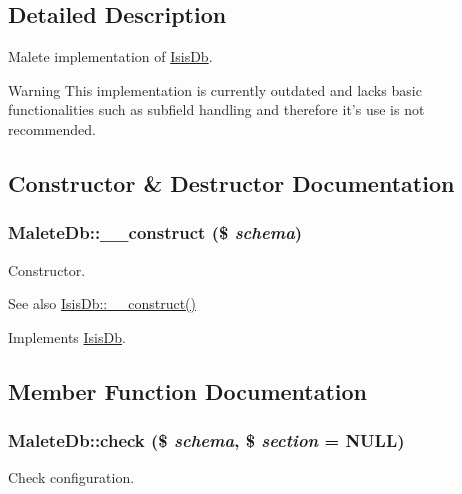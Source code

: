 \subsection{Detailed Description}
Malete implementation of \hyperlink{interfaceIsisDb}{IsisDb}.

\begin{DoxyWarning}{Warning}
This implementation is currently outdated and lacks basic functionalities such as subfield handling and therefore it's use is not recommended. 
\end{DoxyWarning}


\subsection{Constructor \& Destructor Documentation}
\hypertarget{classMaleteDb_a60f87371bc1ec156b010e5b38b4c22e2}{
\subsubsection[{\_\-\_\-construct}]{\setlength{\rightskip}{0pt plus 5cm}MaleteDb::\_\-\_\-construct (\$ {\em schema})}}
\label{classMaleteDb_a60f87371bc1ec156b010e5b38b4c22e2}
Constructor.

\begin{DoxySeeAlso}{See also}
\hyperlink{interfaceIsisDb_ae1c0a3496d55f710d34c5c19ada7a66b}{IsisDb::\_\-\_\-construct()} 
\end{DoxySeeAlso}


Implements \hyperlink{interfaceIsisDb_ae1c0a3496d55f710d34c5c19ada7a66b}{IsisDb}.



\subsection{Member Function Documentation}
\hypertarget{classMaleteDb_ab2da32d84af17df79d947ae32257b4ec}{
\subsubsection[{check}]{\setlength{\rightskip}{0pt plus 5cm}MaleteDb::check (\$ {\em schema}, \/  \$ {\em section} = {\ttfamily NULL})}}
\label{classMaleteDb_ab2da32d84af17df79d947ae32257b4ec}
Check configuration.

